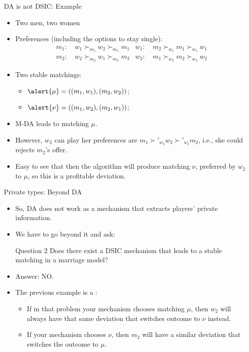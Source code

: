 \documentclass[english,10pt
,aspectratio=169
]{beamer}
\begin{document}
\begin{frame}{DA is not DSIC: Example}
\begin{example}
	\begin{itemize}
		\item Two men, two women
		\item Preferences (including the options to stay single):
		{\footnotesize 
			\begin{align*}
				m_1:& \ w_1 \succ_{m_1} w_2 \succ_{m_1} m_1 	& w_1:& \ m_2 \succ_{w_1} m_1 \succ_{w_1} w_1
				\\
				m_2:& \ w_2 \succ_{m_2} w_1 \succ_{m_2} m_2 	& w_2:& \ m_1 \succ_{w_2} m_2 \succ_{w_2} w_2
			\end{align*}
		}
		\item Two stable matchings: 
		\begin{itemize}
			\item $\alert{\mu} = \left( (m_1,w_1), (m_2,w_2)  \right)$;
			\item $\alert{\nu} = \left( (m_1,w_2), (m_2,w_1)  \right)$;
		\end{itemize}
		\item M-DA leads to matching $\mu$.
		\item However, $w_2$ can play  her preferences are $m_1 \succ'_{w_2} w_2 \succ'_{w_2} m_2$,
		i.e., she could rejects $m_2$'s offer.
		\item Easy to see that then the algorithm will produce matching $\nu$, preferred by $w_2$ to $\mu$, so this is a profitable deviation.
	\end{itemize}
\end{example}
\end{frame}


\begin{frame}{Private types: Beyond DA}
\begin{itemize}
	\item So, DA does not work as a mechanism that extracts players' private information.
	\item We have to go beyond it and ask:
	\begin{block}{Question 2}
		Does there exist a DSIC mechanism that leads to a stable matching in a marriage model?
	\end{block}
	\item Answer: \alert{NO}.
	\item The previous example is a :
	\begin{itemize}
		\item If in that problem your mechanism chooses matching $\mu$, then $w_2$ will always have that same deviation that switches outcome to $\nu$ instead.
		\item If your mechanism chooses $\nu$, then $m_2$ will have a similar deviation that switches the outcome to $\mu$.
	\end{itemize}
\end{itemize}
\end{frame}
\end{document}
